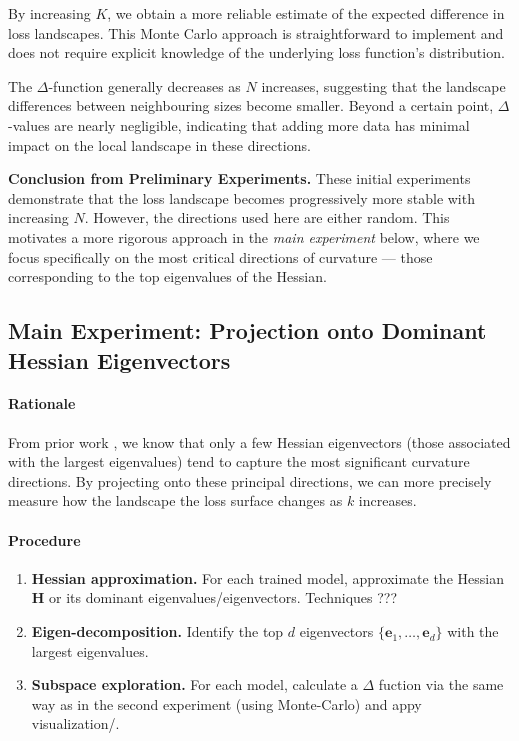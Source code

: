 \documentclass{article}
\begin{document}
By increasing $K$, we obtain a more reliable estimate of the expected difference in loss landscapes.
This Monte Carlo approach is straightforward to implement and does not require explicit knowledge of the underlying loss
function's distribution.

The $\Delta$-function generally decreases as $N$ increases, suggesting that the landscape differences between neighbouring
sizes become smaller.
Beyond a certain point, $\Delta$-values are nearly negligible, indicating that adding more data has minimal impact on
the local landscape in these directions.


\noindent
\textbf{Conclusion from Preliminary Experiments.}
These initial experiments demonstrate that the loss landscape becomes progressively more stable with increasing $N$.
However, the directions used here are either random. This motivates a more rigorous approach in the \emph{main experiment}
below, where we focus specifically on the most critical directions of curvature --- those corresponding to the top
eigenvalues of the Hessian.

\subsection{Main Experiment: Projection onto Dominant Hessian Eigenvectors}

\paragraph{Rationale}
From prior work \cite{sagun2018empirical}, we know that only a few Hessian eigenvectors (those associated with the largest
eigenvalues) tend to capture the most significant curvature directions. By projecting onto these principal directions,
we can more precisely measure how the landscape the loss surface changes as $k$ increases.

\paragraph{Procedure}
\begin{enumerate}
  \item \textbf{Hessian approximation.} For each trained model, approximate
        the Hessian $\mathbf{H}$ or its dominant eigenvalues/eigenvectors. Techniques ???
  \item \textbf{Eigen-decomposition.} Identify the top $d$ eigenvectors $\{\mathbf{e}_1, \dots, \mathbf{e}_d\}$ with the
        largest eigenvalues.
  \item \textbf{Subspace exploration.} For each model, calculate a $\Delta$ fuction via the same way as in the second
        experiment (using Monte-Carlo) and appy visualization/.
\end{enumerate}
\end{document}
